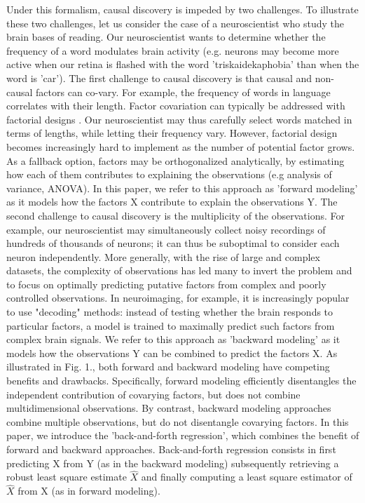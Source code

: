 \documentclass{article}
\begin{document}
%
Under this formalism, causal discovery is impeded by two challenges.
%
To illustrate these two challenges, let us consider the case of a neuroscientist who study the brain bases of reading. Our neuroscientist wants to determine whether the frequency of a word modulates brain activity (e.g. neurons may become more active when our retina is flashed with the word 'triskaidekaphobia' than when the word is 'car').
%
%
The first challenge to causal discovery is that causal and non-causal factors can co-vary. For example, the frequency of words in language correlates with their length. Factor covariation can typically be addressed with factorial designs \cite{fisher_1935}. Our neuroscientist may thus carefully select words matched in terms of lengths, while letting their frequency vary. However, factorial design becomes increasingly hard to implement as the number of potential factor grows. As a fallback option, factors may be orthogonalized analytically, by estimating how each of them contributes to explaining the observations (e.g analysis of variance, ANOVA). In this paper, we refer to this approach as 'forward modeling' as it models how the factors X contribute to explain the observations Y.
%
%
The second challenge to causal discovery is the multiplicity of the observations. For example, our neuroscientist may simultaneously collect noisy recordings of hundreds of thousands of neurons; it can thus be suboptimal to consider each neuron independently. More generally, with the rise of large and complex datasets, the complexity of observations has led many to invert the problem and to focus on optimally predicting putative factors from complex and poorly controlled observations. In neuroimaging, for example, it is increasingly popular to use "decoding" methods: instead of testing whether the brain responds to particular factors, a model is trained to maximally predict such factors from complex brain signals. We refer to this approach as 'backward modeling' as it models how the observations Y can be combined to predict the factors X.
%
%
As illustrated in Fig. 1., both forward and backward modeling have competing benefits and drawbacks. Specifically, forward modeling efficiently disentangles the independent contribution of covarying factors, but does not combine multidimensional observations. By contrast, backward modeling approaches combine multiple observations, but do not disentangle covarying factors.
%
%
In this paper, we introduce the 'back-and-forth regression', which combines the benefit of forward and backward approaches. Back-and-forth regression consists in first predicting X from Y (as in the backward modeling) subsequently retrieving a robust least square estimate $\hat X$ and finally computing a least square estimator of $\hat X$ from X (as in forward modeling).
\end{document}
